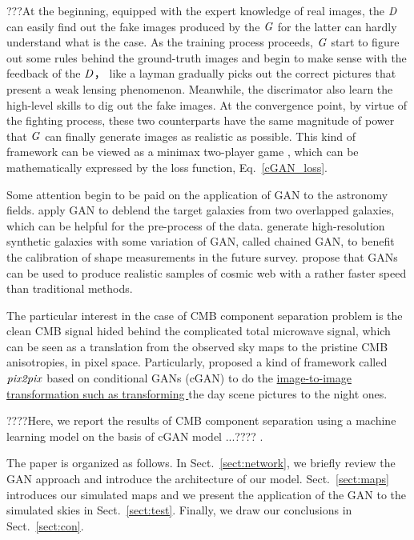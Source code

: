 \documentclass[floatfix]{emulateapj}
\begin{document}
???At the beginning, equipped with the expert knowledge of real images, the $\it{D}$ can easily find out the fake images produced by the $\it{G}$ for the latter can hardly understand what is the case. As the training process proceeds, $\it{G}$ start to figure out some rules behind the  ground-truth images and begin to make sense with the feedback of the $\it{D}$， like a layman gradually picks out the correct pictures that present a weak lensing phenomenon. Meanwhile, the discrimator also learn the high-level skills to dig out the fake images. At the convergence point, by virtue of the fighting process, these two counterparts have the same magnitude of power that $\it{G}$ can finally generate images as realistic as possible. This kind of framework can be viewed as a minimax two-player game \citep{2014arXiv1406.2661G},  which can be mathematically expressed by the loss function, Eq.~\ref{cGAN_loss}.

Some attention begin to be paid on the application of GAN to the astronomy fields. 
\cite{2018arXiv181010098R} apply GAN to deblend the target galaxies from two overlapped galaxies, which can be helpful for the pre-process of the data. \cite{2018arXiv181103081F} generate high-resolution synthetic galaxies with some variation of GAN, called chained GAN, to benefit the calibration of shape measurements in the future survey. \cite{2018ComAC...5....4R} propose that GANs can be used to produce realistic samples of cosmic web with a rather faster speed than traditional methods. 

The particular interest in the case of CMB component separation problem is the clean CMB signal hided behind the complicated total microwave signal, which can be seen as a translation from the observed sky maps to the pristine CMB anisotropies, in pixel space. Particularly, \cite{2016arXiv161107004I} proposed a kind of framework called $\it{pix2pix}$ based on conditional GANs (cGAN) to do the \underline{image-to-image transformation such as transforming }the day scene pictures to the night ones. 

????Here, we report the results of CMB component separation using a machine learning model on the basis of cGAN model ...???? . 

The paper is organized as follows. In Sect.~\ref{sect:network}, we briefly review the GAN approach and introduce the architecture of our model. Sect.~\ref{sect:maps} introduces our simulated maps and we present the application of the GAN to the simulated skies in Sect.~\ref{sect:test}. Finally, we draw our conclusions in Sect.~\ref{sect:con}.
\end{document}

